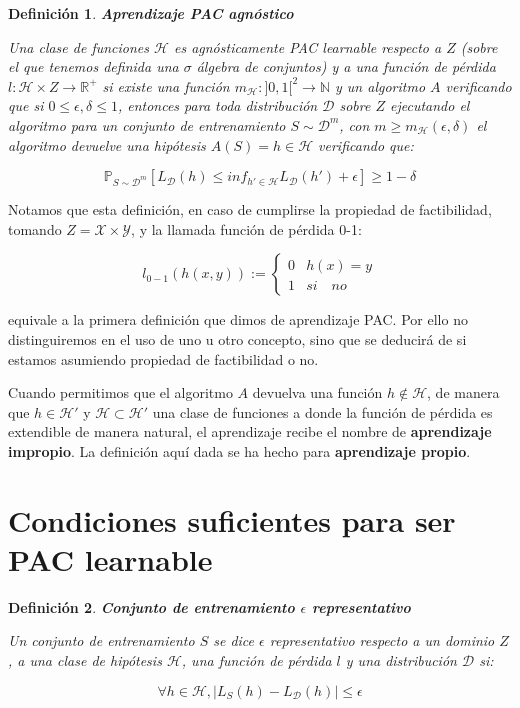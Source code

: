 \documentclass[11pt]{article}
\newtheorem{definition}{Definición}
\begin{document}
\begin{definition}
\textbf{Aprendizaje PAC agnóstico}

Una clase de funciones $\mathcal{H}$ es agnósticamente PAC learnable respecto a $Z$ (sobre el que tenemos definida una $\sigma$ álgebra de conjuntos) y a una función de pérdida $l: \mathcal{H} \times Z \rightarrow \mathbb{R}^{+}$ si existe una función $m_{\mathcal{H}} : ]0,1[^2\rightarrow \mathbb{N}$ y un algoritmo $A$ verificando que si $0 \le \epsilon, \delta \le 1$, entonces para toda distribución $\mathcal{D}$ sobre $Z$ ejecutando el algoritmo para un conjunto de entrenamiento $S\sim \mathcal{D}^m$, con $m\ge m_{\mathcal{H}}(\epsilon, \delta)$ el algoritmo devuelve una hipótesis $A(S) = h\in \mathcal{H}$ verificando que:

\[\mathbb{P}_{S\sim \mathcal{D}^m}[L_{\mathcal{D}}(h) \le inf_{h'\in \mathcal{H}} L_{\mathcal{D}}(h') + \epsilon] \ge 1-\delta\]
\end{definition}


Notamos que esta definición, en caso de cumplirse la propiedad de factibilidad, tomando $Z = \mathcal{X} \times \mathcal{Y}$, y la llamada función de pérdida 0-1:

\[l_{0-1} (h(x,y)) := \left\{\begin{array}{ll}
0 & h(x) = y\\
1 & si \quad no
\end{array}\right.\]

equivale a la primera definición que dimos de aprendizaje PAC. Por ello no distinguiremos en el uso de uno u otro concepto, sino que se deducirá de si estamos asumiendo propiedad de factibilidad o no.

Cuando permitimos que el algoritmo $A$ devuelva una función $h \notin \mathcal{H}$, de manera que $h \in \mathcal{H}'$ y $\mathcal{H} \subset \mathcal{H}'$ una clase de funciones a donde la función de pérdida es extendible de manera natural, el aprendizaje recibe el nombre de \textbf{aprendizaje impropio}. La definición aquí dada se ha hecho para \textbf{aprendizaje propio}.

\section{Condiciones suficientes para ser PAC learnable}
\label{sec-4}
\begin{definition}
\textbf{Conjunto de entrenamiento $\epsilon$ representativo}

Un conjunto de entrenamiento $S$ se dice $\epsilon$ representativo respecto a un dominio $Z$, a una clase de hipótesis $\mathcal{H}$, una función de pérdida $l$ y una distribución $\mathcal{D}$ si:

\[\forall h\in \mathcal{H}, |L_S(h)-L_{\mathcal{D}}(h)| \le \epsilon\]
\end{definition}
\end{document}
